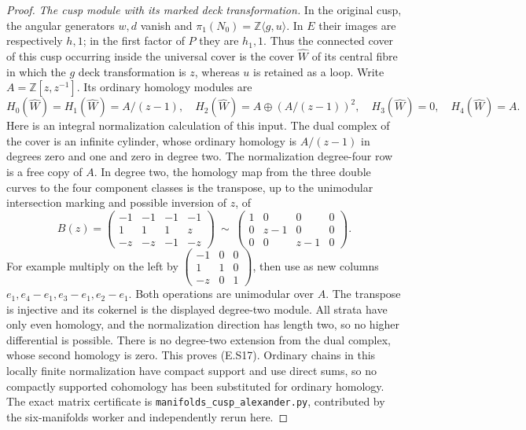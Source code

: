 \begin{proof}
\emph{The cusp module with its marked deck transformation.}
In the original cusp, the angular generators $w,d$ vanish and
$\pi_1(N_0)=\mathbb Z\langle g,u\rangle$. In $E$ their images
are respectively $h,1$; in the first factor of $P$ they are
$h_1,1$. Thus the connected cover of this cusp occurring inside
the universal cover is the cover $\widehat W$ of its central
fibre in which the $g$ deck transformation is $z$, whereas $u$
is retained as a loop. Write $A=\mathbb Z[z,z^{-1}]$.
Its ordinary homology modules are
\[
 H_0(\widehat W)=H_1(\widehat W)=A/(z-1),\quad
 H_2(\widehat W)=A\oplus(A/(z-1))^2,
 \quad H_3(\widehat W)=0,\quad H_4(\widehat W)=A.
 \tag{E.S17}
\]
Here is an integral normalization calculation of this input.
The dual complex of the cover is an infinite cylinder, whose
ordinary homology is $A/(z-1)$ in degrees zero and one and zero
in degree two. The normalization degree-four row is a free
copy of $A$. In degree two, the homology map from the three
double curves to the four component classes is the transpose,
up to the unimodular intersection marking and possible inversion
of $z$, of
\[
 B(z)=\begin{pmatrix}
 -1&-1&-1&-1\\ 1&1&1&z\\-z&-z&-1&-z
 \end{pmatrix}
 \ \sim\
 \begin{pmatrix}1&0&0&0\\0&z-1&0&0\\0&0&z-1&0\end{pmatrix}.
 \tag{E.S18}
\]
For example multiply on the left by
$\left(\begin{smallmatrix}-1&0&0\\1&1&0\\-z&0&1\end{smallmatrix}\right)$,
then use as new columns $e_1,e_4-e_1,e_3-e_1,e_2-e_1$.
Both operations are unimodular over $A$. The transpose is
injective and its cokernel is the displayed degree-two module.
All strata have only even homology, and the normalization
direction has length two, so no higher differential is possible.
There is no degree-two extension from the dual complex, whose
second homology is zero. This proves (E.S17). Ordinary chains
in this locally finite normalization have compact support and
use direct sums, so no compactly supported cohomology has been
substituted for ordinary homology. The exact matrix certificate
is \texttt{manifolds\_cusp\_alexander.py}, contributed by the
six-manifolds worker and independently rerun here.


\end{proof}
